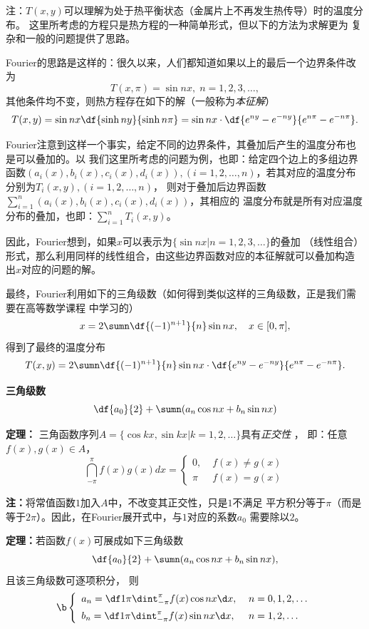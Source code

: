\begin{shaded}
	注：$T(x,y)$可以理解为处于热平衡状态（金属片上不再发生热传导）时的温度分布。
	这里所考虑的方程只是热方程的一种简单形式，但以下的方法为求解更为
	复杂和一般的问题提供了思路。
	
	Fourier的思路是这样的：很久以来，人们都知道如果以上的最后一个边界条件改为
	$$T(x,\pi)=\sin nx,\;n=1,2,3,\ldots,$$
	其他条件均不变，则热方程存在如下的解（一般称为{\it 本征解}）
	$$T(x,y)=\sin nx\df{\sinh ny}{\sinh n\pi}
	=\sin nx\cdot\df{e^{ny}-e^{-ny}}{e^{n\pi}-e^{-n\pi}}.$$
	
	Fourier注意到这样一个事实，给定不同的边界条件，其叠加后产生的温度分布也是可以叠加的。以
	我们这里所考虑的问题为例，也即：给定四个边上的多组边界函数$(a_i(x),b_i(x),c_i(x),
	d_i(x)),(i=1,2,\ldots,n)$，若其对应的温度分布分别为$T_i(x,y),(i=1,2,\ldots,n)$，
	则对于叠加后边界函数$\sum\limits_{i=1}^n(a_i(x),b_i(x),c_i(x),d_i(x))$，其相应的
	温度分布就是所有对应温度分布的叠加，也即：$\sum\limits_{i=1}^nT_i(x,y)$。
	
	因此，Fourier想到，如果$x$可以表示为$\{\sin nx|n=1,2,3,\ldots\}$的叠加
	（线性组合）形式，那么利用同样的线性组合，由这些边界函数对应的本征解就可以叠加构造
	出$x$对应的问题的解。
	
	最终，Fourier利用如下的三角级数（如何得到类似这样的三角级数，正是我们需要在高等数学课程
	中学习的）
	$$x=2\sumn\df{(-1)^{n+1}}{n}\sin{nx},\quad x\in[0,\pi],$$
	得到了最终的温度分布
	$$T(x,y)=2\sumn\df{(-1)^{n+1}}{n}\sin{nx}
	\cdot\df{e^{ny}-e^{-ny}}{e^{n\pi}-e^{-n\pi}}.$$
\end{shaded}

{\bf 三角级数}
$${\df{a_0}{2}+\sumn(a_n\cos nx+b_n\sin nx)}$$ 

{\bf 定理：}
三角函数序列$A=\{\cos kx,\sin kx|k=1,2,\ldots\}$具有{\it 正交性} ，
即：任意$f(x),g(x)\in A$，
$$\dint_{-\pi}^{\pi}f(x)g(x)dx=\left\{\begin{array}{ll}
0,\;& f(x)\ne g(x)\\ \pi\;& f(x)=g(x)
\end{array}\right.$$

{\bf 注：}将常值函数$1$加入$A$中，不改变其正交性，只是$1$不满足
平方积分等于$\pi$（而是等于$2\pi$）。因此，在Fourier展开式中，与$1$对应的系数$a_0$
需要除以$2$。

{\bf 定理：}若函数$f(x)$可展成如下三角级数
$$\df{a_0}{2}+\sumn(a_n\cos nx+b_n\sin nx),$$
且该三角级数可逐项积分， 则
$${\b\left\{\begin{array}{ll}
a_n=\df1{\pi}\dint_{-\pi}^{\pi}f(x)\cos nx\d x,\;& n=0,1,2,\ldots\\[5pt]
b_n=\df1{\pi}\dint_{-\pi}^{\pi}f(x)\sin nx\d x,\;& n=1,2,\ldots
\end{array}\right.}$$

